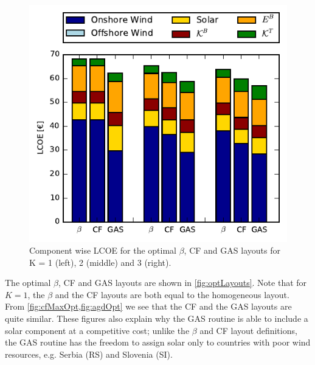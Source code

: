 \documentclass[a4paper, 5p, sort&compress]{elsarticle}%
\begin{document}
\begin{figure}[h!]
  \centering
  \includegraphics[width = \columnwidth]{costVE50}
  \caption{Component wise LCOE for the optimal $\beta$, CF and GAS layouts
    for K = 1 (left), 2 (middle) and 3 (right).}
  \label{fig:cost}
\end{figure}

The optimal $\beta$, CF and GAS layouts are shown in
\cref{fig:optLayouts}. Note that for $K=1$, the $\beta$ and the
CF layouts are both equal to the homogeneous layout. From
\cref{fig:cfMaxOpt,fig:agdOpt} we see that the CF and the GAS
layouts are quite similar. These figures also explain why the GAS
routine is able to include a solar component at a competitive cost;
unlike the $\beta$ and CF layout definitions, the GAS routine has
the freedom to assign solar only to countries with poor wind
resources, e.g. Serbia (RS) and Slovenia (SI). %

\end{document}
